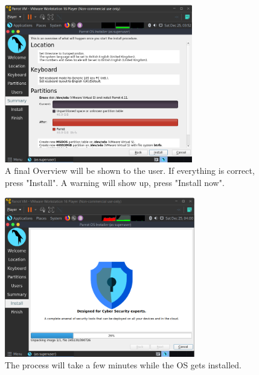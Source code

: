 \documentclass[a4paper]{article}
\begin{document}
    \begin{figure}[h!]
        \centering
        \includegraphics[width=0.73\textwidth]{Images/Install_OS/OS_8.png}
        \caption{A final Overview will be shown to the user. If everything is correct, press "Install".
        A warning will show up, press "Install now".}
    \end{figure}

    \clearpage
    \begin{figure}[h]
        \centering
        \includegraphics[width=0.74\textwidth]{Images/Install_OS/OS_9.png}
        \caption{The process will take a few minutes while the OS gets installed.}
    \end{figure}

    \vfill
\end{document}
